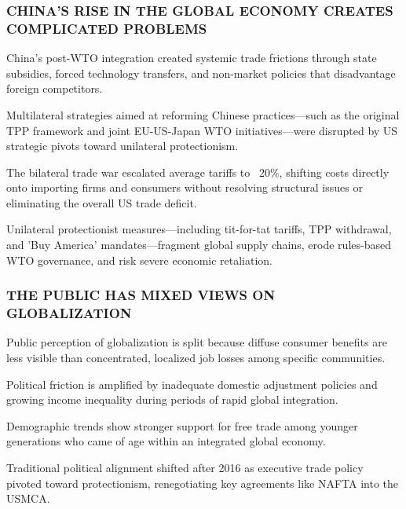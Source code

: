 \documentclass[10pt, aspectratio=169]{beamer}
\begin{document}
\begin{frame}[t]
    \frametitle{CHINA'S RISE IN THE GLOBAL ECONOMY CREATES COMPLICATED PROBLEMS}
    \vfill
    \begin{itemize}
        \setlength{\itemsep}{0.35cm}
        {\small
        \item China's post-WTO integration created systemic trade frictions through state subsidies, forced technology transfers, and non-market policies that disadvantage foreign competitors.
        \item Multilateral strategies aimed at reforming Chinese practices—such as the original TPP framework and joint EU-US-Japan WTO initiatives—were disrupted by US strategic pivots toward unilateral protectionism.
        \item The bilateral trade war escalated average tariffs to ~20\%, shifting costs directly onto importing firms and consumers without resolving structural issues or eliminating the overall US trade deficit.
        \item Unilateral protectionist measures—including tit-for-tat tariffs, TPP withdrawal, and 'Buy America' mandates—fragment global supply chains, erode rules-based WTO governance, and risk severe economic retaliation.
        }
    \end{itemize}
    \vfill
\end{frame}
\begin{frame}[t]
    \frametitle{THE PUBLIC HAS MIXED VIEWS ON GLOBALIZATION}
    \vfill
    \begin{itemize}
        \setlength{\itemsep}{0.35cm}
        {\small
        \item Public perception of globalization is split because diffuse consumer benefits are less visible than concentrated, localized job losses among specific communities.
        \item Political friction is amplified by inadequate domestic adjustment policies and growing income inequality during periods of rapid global integration.
        \item Demographic trends show stronger support for free trade among younger generations who came of age within an integrated global economy.
        \item Traditional political alignment shifted after 2016 as executive trade policy pivoted toward protectionism, renegotiating key agreements like NAFTA into the USMCA.
        }
    \end{itemize}
    \vfill
\end{frame}
\end{document}
